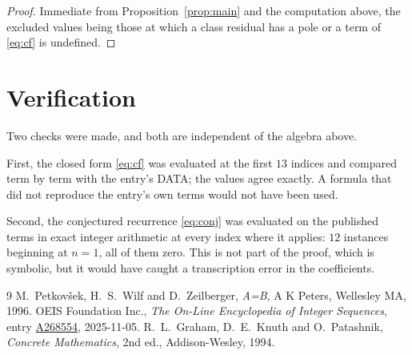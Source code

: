 \documentclass[11pt,a4paper]{article}
\theoremstyle{plain}
\theoremstyle{definition}
\begin{document}
\begin{proof}
Immediate from Proposition~\ref{prop:main} and the computation above, the excluded values
being those at which a class residual has a pole or a term of \eqref{eq:cf} is undefined.
\end{proof}

\section{Verification}

Two checks were made, and both are independent of the algebra above.

First, the closed form \eqref{eq:cf} was evaluated at the first $13$ indices and
compared term by term with the entry's DATA; the values agree exactly. A formula that did
not reproduce the entry's own terms would not have been used.

Second, the conjectured recurrence \eqref{eq:conj} was evaluated on the published terms in
exact integer arithmetic at every index where it applies: $12$ instances beginning at
$n=1$, all of them zero. This is not part of the proof, which is symbolic, but it
would have caught a transcription error in the coefficients.

\begin{thebibliography}{9}
 M.~Petkov\v{s}ek, H.~S.~Wilf and D.~Zeilberger, \emph{A=B}, A K Peters,
Wellesley MA, 1996.
 OEIS Foundation Inc., \emph{The On-Line Encyclopedia of Integer Sequences},
entry \href{https://oeis.org/A268554}{A268554}, 2025-11-05.
 R.~L.~Graham, D.~E.~Knuth and O.~Patashnik, \emph{Concrete Mathematics},
2nd ed., Addison-Wesley, 1994.
\end{thebibliography}
\end{document}
